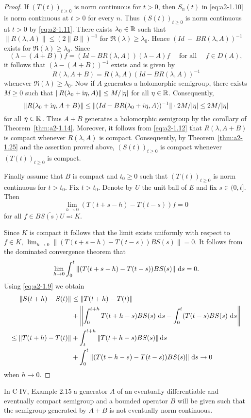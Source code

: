 \begin{proof}
If $(T(t))_{t \geq 0}$ is norm continuous for $t > 0$, then $S_{n}(t)$ in \eqref{eq:a2-1.10} is norm continuous at $t > 0$ for every $n$.
Thus $(S(t))_{t \geq 0}$ is norm continuous at $t > 0$ by \eqref{eq:a2-1.11}.
There exists $\lambda_{0} \in \mathbb{R}$ such that 
$\|R(\lambda,A)\| \leq (2\|B\|)^{-1}$ for $\Re(\lambda) \geq \lambda_{0}$.
Hence $(Id~-~BR(\lambda,A))^{-1}$ exists for $\Re(\lambda) \geq \lambda_{0}$.
Since 
\[
(\lambda -(A+B))f = (Id - BR(\lambda,A))(\lambda - A)f  \quad \text{ for all } \quad f \in D(A),
\]
it follows that $(\lambda-(A+B))^{-1}$ exists and is given by
\begin{equation}\label{eq:a2-1.12}
    R(\lambda,A+B) = R(\lambda,A)(Id-BR(\lambda,A))^{-1}
\end{equation}
whenever $\Re(\lambda) \geq \lambda_{0}$.
Now if $A$ generates a holomorphic semigroup, there exists $M \geq 0$ such that $\|R(\lambda_{0}+\mathrm{i}\eta,A)\| \leq M/|\eta|$ for all $\eta \in \mathbb{R}$.
Consequently, 
\[
\|R(\lambda_{0}+\mathrm{i}\eta,A+B)\| \leq \|(Id-BR(\lambda_{0}+i\eta,A))^{-1}\| \cdot 2M/|\eta| \leq 2M/|\eta|
\]
for all $\eta \in \mathbb{R}$\,.
Thus $A + B$ generates a holomorphic semigroup by the corollary of Theorem~\ref{thm:a2-1.14}.
Moreover, it follows from \eqref{eq:a2-1.12}  that $R(\lambda,A+B)$ is compact whenever $R(\lambda,A)$  is compact.
Consequently, by Theorem~\ref{thm:a2-1.25} and the  assertion proved above, $(S(t))_{t \geq 0}$ is compact whenever $(T(t))_{t \geq 0}$ is compact.

Finally assume that $B$ is compact and $t_{0} \geq 0$ such that $(T(t))_{t \geq 0}$ 
is norm continuous for $t > t_{0}$.
Fix $t > t_{0}$.
Denote by $U$ the unit ball of $E$ and fix $s \in (0,t]$.
Then
\[
    \lim_{h \to 0} (T(t+s-h) - T(t-s))f = 0
\]
for all $f \in \overline{BS(s)U} \eqqcolon K$.

Since $K$ is compact it follows that the limit exists uniformly with respect to $f \in K$, \ie  
$\lim_{h \to 0} \|(T(t+s-h) - T(t-s))BS(s)\| = 0$.
It follows from the dominated convergence theorem that
\begin{equation}\label{eq:a2-1.13}
    \lim_{h \to 0} \int_{0}^{t} \|(T(t+s-h) - T(t-s))BS(s)\|\, \mathop{}\!\mathrm{d}{s} = 0.
\end{equation}
Using  \eqref{eq:a2-1.9}  we obtain 
\begin{align*}
	\|S(t+h) - S(t)\| &\leq \|T(t+h) - T(t)\|   \\
	&+  \left\| \int_{0}^{t+h} T(t+h-s)BS(s)\, \mathop{}\!\mathrm{d}{s} 
	-  \int_{0}^{t} (T(t-s)BS(s)\, \mathop{}\!\mathrm{d}{s} \right\|  \\
	\leq \|T(t+h) - T(t)\| &+ \int_{t}^{t+h} \|T(t+h-s)BS(s)\| \mathop{}\!\mathrm{d}{s}    \\ 
	&+ \int_{0}^{t} \|(T(t+h-s) - T(t-s))BS(s)\|\, \mathop{}\!\mathrm{d}{s} \to 0 
\end{align*}
when  $h \to 0$. 	
\end{proof}
In C-IV, Example 2.15 a generator $A$ of an eventually differentiable and eventually compact semigroup and a bounded operator $B$ will be given such that the semigroup generated by $A+B$ is not eventually norm continuous.

